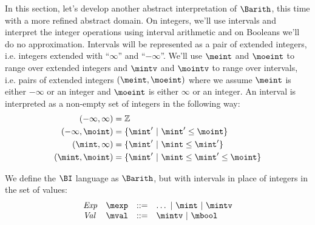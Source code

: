 In this section, let's develop another abstract interpretation of
$\Barith$, this time with a more refined abstract domain.  On
integers, we'll use intervals and interpret the integer operations
using interval arithmetic and on Booleans we'll do no approximation.
Intervals will be represented as a pair of extended integers,
i.e. integers extended with ``$\infty$'' and ``$-\infty$''.  We'll use
$\meint$ and $\moeint$ to range over extended integers and $\mintv$
and $\mointv$ to range over intervals, i.e. pairs of extended integers
$(\meint,\moeint)$ where we assume $\meint$ is either $-\infty$ or an
integer and $\moeint$ is either $\infty$ or an integer.  An interval
is interpreted as a non-empty set of integers in the following way:
\begin{align*}
(-\infty,\infty) &= \mathbb{Z}\\
(-\infty,\moint) &= \{ \mint'\ |\ \mint' \leq \moint \}\\
(\mint,\infty) &= \{ \mint'\ |\ \mint \leq \mint' \}\\
(\mint,\moint) &= \{ \mint'\ |\ \mint \leq \mint' \leq \moint \}
\end{align*}

We define the $\BI$ language as $\Barith$, but with intervals in place
of integers in the set of values:
\[
\begin{array}{llcl}
\mathit{Exp}  & \mexp & ::= & \dots\ |\ \mint\ |\ \mintv\\
\mathit{Val}  & \mval & ::= & \mintv\ |\ \mbool
\end{array}
\]

